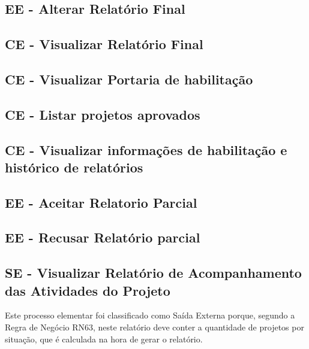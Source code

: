   \subsection{EE - Alterar Relatório Final}
  \subsection{CE - Visualizar Relatório Final}
  \subsection{CE - Visualizar Portaria de habilitação}
  \subsection{CE - Listar projetos aprovados}
  \subsection{CE - Visualizar informações de habilitação e histórico de relatórios}
  \subsection{EE - Aceitar Relatorio Parcial}
  \subsection{EE - Recusar Relatório parcial}
  
  \subsection{SE - Visualizar Relatório de Acompanhamento das Atividades do Projeto}
  
    Este processo elementar foi classificado como Saída Externa porque, segundo a Regra de Negócio RN63, neste relatório
    deve conter a quantidade de projetos por situação, que é calculada na hora de gerar o relatório.
    

